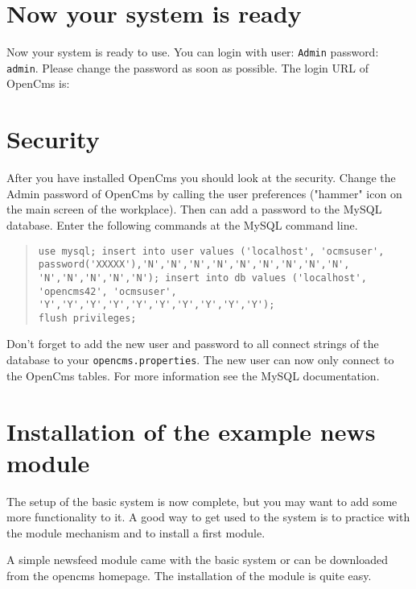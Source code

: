 \section{Now your system is ready}
Now your system is ready to use. You can login with user:
\texttt{Admin} password: \texttt{admin}. Please change the
password as soon as possible. The login URL of OpenCms is:

\section{Security}
After you have installed OpenCms you should look at the security.
Change the Admin password of OpenCms by calling the user
preferences ("hammer" icon on the main screen of the workplace).
Then can add a password to the MySQL database. Enter the following
commands
at the MySQL command line.\\

\begin{quote}
\begin{verbatim}
use mysql; insert into user values ('localhost', 'ocmsuser',
password('XXXXX'),'N','N','N','N','N','N','N','N','N',
'N','N','N','N','N'); insert into db values ('localhost',
'opencms42', 'ocmsuser', 'Y','Y','Y','Y','Y','Y','Y','Y','Y','Y');
flush privileges;
\end{verbatim}
\end{quote}

Don't forget to add the new user and password to all connect
strings of the database to your \texttt{opencms.properties}. The
new user can now only connect to the OpenCms tables. For more
information see the MySQL documentation.

\section{Installation of the example news module}

The setup of the basic system is now complete, but you may want to
add some more functionality to it. A good way to get used to the
system is to practice with the module mechanism and to install a
first module.

A simple newsfeed module came with the basic system or can be
downloaded from the opencms homepage. The installation of the
module is quite easy.

